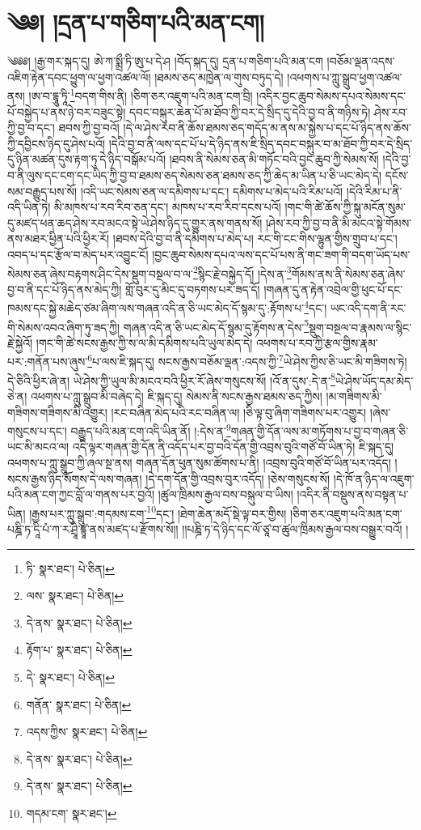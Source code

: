 \setcounter{footnote}{0} 
\chapter{༄༅། །དྲན་པ་གཅིག་པའི་མན་ངག།}༄༅༅། །རྒྱ་གར་སྐད་དུ། ཨེ་ཀ་སྨྲྀ་ཏི་ཨུ་པ་དེ་ཤ །བོད་སྐད་དུ། དྲན་པ་གཅིག་པའི་མན་ངག །བཅོམ་ལྡན་འདས་འཇིག་རྟེན་དབང་ཕྱུག་ལ་ཕྱག་འཚལ་ལོ། །ཐམས་ཅད་མཁྱེན་ལ་གུས་བཏུད་དེ། །འཕགས་པ་ཀླུ་སྒྲུབ་ཕྱག་འཚལ་ནས། །ཨ་བ་དྷཱུ་ཏཱི་\footnote{ཏི་  སྣར་ཐང་།  པེ་ཅིན། }བདག་གིས་ནི། །ཅིག་ཅར་འཇུག་པའི་མན་ངག་བྲི། །འདིར་བྱང་ཆུབ་སེམས་དཔའ་སེམས་དང་པོ་བསྐྱེད་པ་ནས་ཉེ་བར་བཟུང་སྟེ། དབང་བསྐུར་ཆེན་པོ་མ་ཐོབ་ཀྱི་བར་དེ་སྲིད་དུ་དེའི་བྱ་བ་ནི་གཉིས་ཏེ། ཤེས་རབ་ཀྱི་བྱ་བ་དང་། ཐབས་ཀྱི་བྱ་བའོ། །དེ་ལ་ཤེས་རབ་ནི་ཆོས་ཐམས་ཅད་གདོད་མ་ནས་མ་སྐྱེས་པ་དང་པོ་ཉིད་ནས་ཆོས་ཀྱི་དབྱིངས་ཉིད་དུ་ཤེས་པའོ། །དེའི་བྱ་བ་ནི་ལས་དང་པོ་པ་དེ་ཉིད་ནས་ཇི་སྲིད་དབང་བསྐུར་བ་མ་ཐོབ་ཀྱི་བར་དེ་སྲིད་དུ་ཉིན་མཚན་དུས་རྟག་ཏུ་དེ་ཉིད་བསྒོམ་པའོ། །ཐབས་ནི་སེམས་ཅན་མི་གཏོང་བའི་བྱང་ཆུབ་ཀྱི་སེམས་སོ། །དེའི་བྱ་བ་ནི་ལུས་དང་ངག་དང་ཡིད་ཀྱི་བྱ་བ་ཐམས་ཅད་སེམས་ཅན་ཐམས་ཅད་ཀྱི་ཆེད་མ་ཡིན་པ་ཅི་ཡང་མེད་དེ། དངོས་སམ་བརྒྱུད་པས་སོ། །འདི་ཡང་སེམས་ཅན་ལ་དམིགས་པ་དང་། དམིགས་པ་མེད་པའི་རིམ་པའོ། །དེའི་རིམ་པ་ནི་འདི་ཡིན་ཏེ། མི་མཁས་པ་རབ་རིབ་ཅན་དང་། མཁས་པ་རབ་རིབ་དངས་པའོ། །གང་གི་ཚེ་ཆོས་ཀྱི་སྐུ་མངོན་སུམ་དུ་མཛད་ཕན་ཆད་ཤེས་རབ་མངའ་སྟེ་ཡེ་ཤེས་ཉིད་དུ་གྱུར་ནས་གནས་སོ། །ཤེས་རབ་ཀྱི་བྱ་བ་ནི་མི་མངའ་སྟེ་གོམས་ནས་མཐར་ཕྱིན་པའི་ཕྱིར་རོ། །ཐབས་དེའི་བྱ་བ་ནི་དམིགས་པ་མེད་པ། རང་གི་ངང་གིས་ལྷུན་གྱིས་གྲུབ་པ་དང་། འབད་པ་དང་རྩོལ་བ་མེད་པར་འབྱུང་ངོ། །བྱང་ཆུབ་སེམས་དཔའ་ལས་དང་པོ་པས་ནི་གང་ཟག་གི་བདག་ཡོད་པས་སེམས་ཅན་ཞེས་བརྟགས་ཤིང་དེས་སྡུག་བསྔལ་བ་ལ་\footnote{ལས་  སྣར་ཐང་།  པེ་ཅིན། }སྙིང་རྗེ་བསྐྱེད་དོ། །དེས་ན་\footnote{དེ་ནས་  སྣར་ཐང་།  པེ་ཅིན། }གོམས་ནས་ནི་སེམས་ཅན་ཞེས་བྱ་བ་ནི་དང་པོ་ཉིད་ནས་མེད་ཀྱི། གློ་བུར་དུ་མིང་དུ་བཏགས་པར་ཟད་དོ། །གཞན་དུ་ན་རྟེན་འབྲེལ་གྱི་ཕུང་པོ་དང་ཁམས་དང་སྐྱེ་མཆེད་ཙམ་ཞིག་ལས་གཞན་འདི་ན་ཅི་ཡང་མེད་དོ་སྙམ་དུ་:རྟོགས་པ་\footnote{རྟོག་པ་  སྣར་ཐང་།  པེ་ཅིན། }དང་། ཡང་འདི་དག་ནི་རང་གི་སེམས་འབའ་ཞིག་ཏུ་ཟད་ཀྱི། གཞན་འདི་ན་ཅི་ཡང་མེད་དོ་སྙམ་དུ་རྟོགས་ན་དེས་\footnote{དེ་  སྣར་ཐང་།  པེ་ཅིན། }སྡུག་བསྔལ་བ་རྣམས་ལ་སྙིང་རྗེ་སྐྱེའོ། །གང་གི་ཚེ་སངས་རྒྱས་ཀྱི་ས་ལ་མི་དམིགས་པའི་ཡུལ་མེད་དེ། འཕགས་པ་རབ་ཀྱི་རྩལ་གྱིས་རྣམ་པར་:གནོན་པས་ཞུས་\footnote{གནོན་  སྣར་ཐང་།  པེ་ཅིན། }པ་ལས་ཇི་སྐད་དུ། སངས་རྒྱས་བཅོམ་ལྡན་:འདས་ཀྱི་\footnote{འདས་ཀྱིས་  སྣར་ཐང་།  པེ་ཅིན། }ཡེ་ཤེས་ཀྱིས་ཅི་ཡང་མི་གཟིགས་ཏེ། དེ་ཅིའི་ཕྱིར་ཞེ་ན། ཡེ་ཤེས་ཀྱི་ཡུལ་མི་མངའ་བའི་ཕྱིར་རོ་ཞེས་གསུངས་སོ། །འོ་ན་དུས་:དེ་ན་\footnote{དེ་ནས་  སྣར་ཐང་།  པེ་ཅིན། }ཡེ་ཤེས་ཡོད་དམ་མེད་ཅེ་ན། འཕགས་པ་ཀླུ་སྒྲུབ་མི་བཞེད་དེ། ཇི་སྐད་དུ། སེམས་ནི་སངས་རྒྱས་ཐམས་ཅད་ཀྱིས། །མ་གཟིགས་མི་གཟིགས་གཟིགས་མི་འགྱུར། །རང་བཞིན་མེད་པའི་རང་བཞིན་ལ། །ཅི་ལྟ་བུ་ཞིག་གཟིགས་པར་འགྱུར། །ཞེས་གསུངས་པ་དང་། བརྒྱུད་པའི་མན་ངག་འདི་ཡིན་ནོ། །:དེས་ན་\footnote{དེ་ནས་  སྣར་ཐང་།  པེ་ཅིན། }གཞན་གྱི་དོན་ལས་མ་གཏོགས་པ་བྱ་བ་གཞན་ཅི་ཡང་མི་མངའ་ལ། འདི་ལྟར་གཞན་གྱི་དོན་ནི་འདོད་པར་བྱ་བའི་དོན་གྱི་འབྲས་བུའི་གཙོ་བོ་ཡིན་ཏེ། ཇི་སྐད་དུ། འཕགས་པ་ཀླུ་སྒྲུབ་ཀྱི་ཞལ་སྔ་ནས། གཞན་དོན་ཕུན་སུམ་ཚོགས་པ་ནི། །འབྲས་བུའི་གཙོ་བོ་ཡིན་པར་འདོད། །སངས་རྒྱས་ཉིད་སོགས་དེ་ལས་གཞན། །དེ་དག་དོན་གྱི་འབྲས་བུར་འདོད། །ཅེས་གསུངས་སོ། །དེ་ཁོ་ན་ཉིད་ལ་འཇུག་པའི་མན་ངག་ཀྱང་བློ་ལ་གནས་པར་བྱའོ། །ཚུལ་ཁྲིམས་རྒྱལ་བས་བསྐུལ་བ་ཡིས། །འདིར་ནི་བསྡུས་ནས་བསྟན་པ་ཡིན། །རྒྱས་པར་ཀླུ་སྒྲུབ་:གདམས་ངག་\footnote{གདམ་ངག་  སྣར་ཐང་། }དང་། །ཐེག་ཆེན་མདོ་སྡེ་ལྟ་བར་གྱིས། །ཅིག་ཅར་འཇུག་པའི་མན་ངག་པཎྜི་ཏ་དཱི་པཾ་ཀ་ར་ཤྲཱི་ཛྙཱ་ནས་མཛད་པ་རྫོགས་སོ།། །།པཎྜི་ཏ་དེ་ཉིད་དང་ལོ་ཙཱ་བ་ཚུལ་ཁྲིམས་རྒྱལ་བས་བསྒྱུར་བའོ། ། 